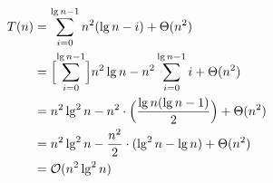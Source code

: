 \documentclass[12pt]{article}
\begin{document}
\begin{enumerate}[1.]
    \begin{align}
        T(n) &= \sum\limits_{i=0}^{\lg n - 1} n^2 (\lg n - i) + \Theta(n^2)\\
        &= \Bigl[ \sum\limits_{i=0}^{\lg n - 1} \Bigr] n^2\lg n - n^2 \sum\limits_{i=0}^{\lg n - 1} i + \Theta(n^2)\\
        &= n^2\lg^2 n - n^2 \cdot \Bigl( \frac{\lg n (\lg n - 1)}{2} \Bigr) + \Theta(n^2)\\
        &= n^2\lg^2 n - \frac{n^2}{2} \cdot (\lg^2 n - \lg n) + \Theta(n^2)\\
        &= \mathcal{O}(n^2\lg^2 n)
    \end{align}


\end{enumerate}
\end{document}
